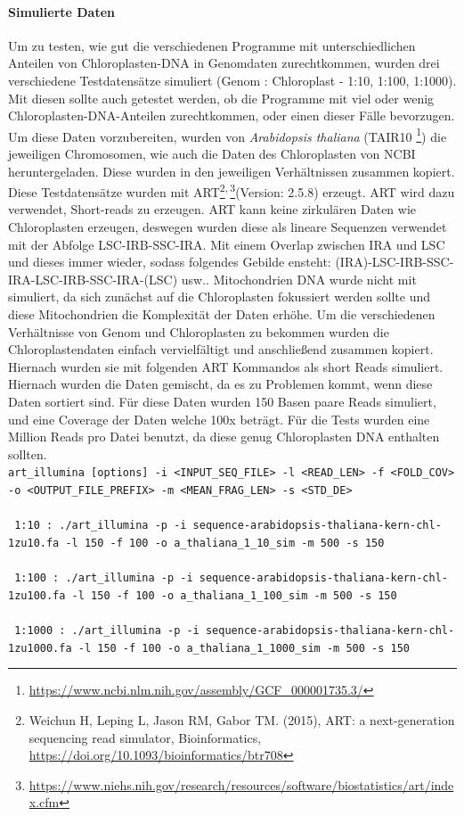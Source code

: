 \documentclass{scrartcl}
\begin{document}
\paragraph{Simulierte Daten}
\label{sec-3-2-1-1}
Um zu testen, wie gut die verschiedenen Programme mit unterschiedlichen Anteilen von Chloroplasten-DNA in
Genomdaten zurechtkommen, wurden drei verschiedene Testdatensätze simuliert (Genom : Chloroplast - 1:10, 1:100, 1:1000). 
Mit diesen sollte auch getestet werden, ob die Programme mit viel oder wenig Chloroplasten-DNA-Anteilen zurechtkommen, oder einen dieser Fälle 
bevorzugen. Um diese Daten vorzubereiten, wurden von \emph{Arabidopsis thaliana} (TAIR10 \footnote{\url{https://www.ncbi.nlm.nih.gov/assembly/GCF_000001735.3/}}) die jeweiligen Chromosomen, wie auch die Daten
des Chloroplasten von NCBI\footnotemark[38]{} heruntergeladen. Diese wurden in den jeweiligen Verhältnissen zusammen kopiert.
Diese Testdatensätze wurden mit ART\footnote{Weichun H, Leping L, Jason RM, Gabor TM. (2015), ART: a next-generation sequencing read simulator, Bioinformatics, \url{https://doi.org/10.1093/bioinformatics/btr708}}\textsuperscript{,}\,\footnote{\url{https://www.niehs.nih.gov/research/resources/software/biostatistics/art/index.cfm}}(Version: 2.5.8) erzeugt. ART wird dazu verwendet, Short-reads zu erzeugen. ART kann keine zirkulären Daten wie Chloroplasten 
erzeugen, deswegen wurden diese als lineare Sequenzen verwendet mit der Abfolge LSC-IRB-SSC-IRA. Mit einem Overlap zwischen IRA und LSC und dieses immer wieder, sodass folgendes Gebilde ensteht: 
(IRA)-LSC-IRB-SSC-IRA-LSC-IRB-SSC-IRA-(LSC) usw.. 
Mitochondrien DNA wurde nicht mit simuliert, da sich zunächst auf die Chloroplasten fokussiert werden sollte und diese Mitochondrien die Komplexität der Daten
erhöhe.
Um die verschiedenen Verhältnisse von Genom und Chloroplasten zu bekommen wurden die Chloroplastendaten einfach
vervielfältigt und anschließend zusammen kopiert. Hiernach wurden sie mit folgenden ART Kommandos als short Reads simuliert.
Hiernach wurden die Daten gemischt, da es zu Problemen kommt, wenn diese Daten sortiert sind. Für diese Daten wurden 150 Basen paare Reads simuliert, 
und eine Coverage der Daten welche 100x beträgt. 
Für die Tests wurden eine Million Reads pro Datei benutzt, da diese genug Chloroplasten DNA enthalten sollten.
\\
\texttt{\small art\_illumina [options] -i <INPUT\_SEQ\_FILE> -l <READ\_LEN> -f <FOLD\_COV>
-o <OUTPUT\_FILE\_PREFIX> -m <MEAN\_FRAG\_LEN> -s <STD\_DE>}
\\
\\
\texttt{ 1:10 : ./art\_illumina -p -i sequence-arabidopsis-thaliana-kern-chl-1zu10.fa -l 150 -f 100
-o a\_thaliana\_1\_10\_sim -m 500 -s 150 }
\\
\\
\texttt{ 1:100 :  ./art\_illumina -p -i sequence-arabidopsis-thaliana-kern-chl-1zu100.fa -l 150 -f 100
-o a\_thaliana\_1\_100\_sim -m 500 -s 150 }
\\
\\
\texttt{ 1:1000 :  ./art\_illumina -p -i sequence-arabidopsis-thaliana-kern-chl-1zu1000.fa -l 150 -f 100
-o a\_thaliana\_1\_1000\_sim -m 500 -s 150 }
\end{document}
